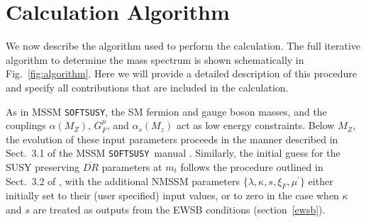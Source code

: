 \documentclass[final,3p,times,pdflatex]{elsarticle}
\def\SOFTSUSY{{\tt SOFTSUSY}}
\begin{document}
\section{Calculation Algorithm \label{sec:calculation}}
We now describe the algorithm used to perform the calculation.  The full 
iterative algorithm to determine the mass spectrum is shown schematically in 
Fig.~\ref{fig:algorithm}.  Here we will provide a detailed description of this 
procedure and specify all contributions that are included in the calculation.

As in MSSM \SOFTSUSY, the SM fermion and gauge boson masses, and the
 couplings $\alpha(M_Z)$, $G_F^\mu$, and $\alpha_s(M_z)$ act as low energy 
constraints. Below $M_Z$, the evolution of these input parameters proceeds in 
the manner described in Sect.\ 3.1 of the MSSM \SOFTSUSY~manual 
\cite{Allanach:2001kg}.  Similarly, the initial guess for the SUSY preserving 
$\overline{DR}$ parameters at $m_t$ follows the procedure outlined in Sect.\ 3.2
of \cite{Allanach:2001kg}, with the additional NMSSM parameters 
$\{\lambda, \kappa, s, \xi_F, \mu^\prime \}$ either initially set to their 
(user specified) input values, or to zero in the case when $\kappa$ and $s$ are 
treated as outputs from the EWSB conditions (section~\ref{ewsb}).
\end{document}
